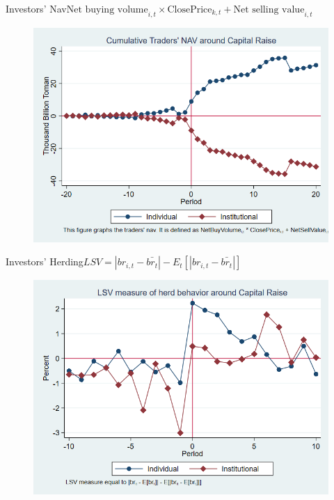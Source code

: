 \documentclass{beamer}
\begin{document}
\begin{frame}{Investors' Nav}{$ \text{Net buying volume}_{i,t} \times \text{ClosePrice}_{k,t} + \text{Net selling value}_{i,t} $}
	\begin{figure}
		\centering
		\includegraphics[width=0.65\linewidth]{Output/IndInsNavCum.png}
		\label{fig:IndInsNavCum}
	\end{figure}
\end{frame}


\begin{frame}{Investors' Herding}{$LSV =  |br_{i,t} - \bar{br_{t}}| - E_t[|br_{i,t} - \bar{br_{t}}|] $}
	\begin{figure}
		\centering
		\includegraphics[width=0.65\linewidth]{Output/IndInsHerd.png}
		\label{fig:IndInsHerd}
	\end{figure}
\end{frame}
\end{document}

